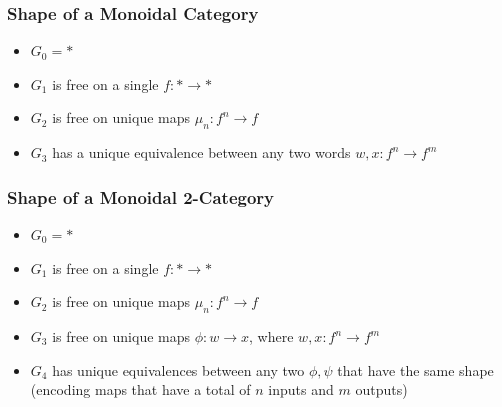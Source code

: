 \documentclass{beamer}
\newcommand{\newthought}[1]{\medskip\noindent\fbox{{#1}}}
\begin{document}
\begin{frame}

\frametitle{Shape of a Monoidal Category}



\newthought{Consider the genre: }

\begin{itemize}
\item $G_0 = *$

\item $G_1$ is free on a single $f: * \to *$

\item $G_2$ is free on unique maps $\mu_n: f^n \to f$

\item $G_3$ has a unique equivalence between any two words $w,x: f^n \to f^m$
\end{itemize}

\begin{center}
\end{center}

\end{frame}



\begin{frame}
\frametitle{Shape of a Monoidal 2-Category}

\vspace{-1cm}

\begin{itemize}
\item $G_0 = *$

\medskip

\item $G_1$ is free on a single $f: * \to *$

\medskip


\item $G_2$ is free on unique maps $\mu_n: f^n \to f$

\medskip

\item $G_3$ is free on unique maps $\phi: w \to x$, where $w,x: f^n \to f^m$

\medskip

\item $G_4$ has unique equivalences between any two $\phi, \psi$ that have the same shape (encoding maps that have a total of $n$ inputs and $m$ outputs)
\end{itemize}
\end{frame}
\end{document}
